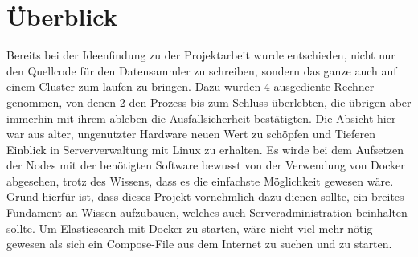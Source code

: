 \documentclass[12pt,oneside,a4paper,parskip]{scrbook}
\begin{document}
\section{Überblick} Bereits bei der Ideenfindung zu der Projektarbeit wurde entschieden, nicht nur den Quellcode für den Datensammler zu schreiben, sondern das ganze auch auf einem Cluster zum laufen zu bringen. Dazu wurden 4 ausgediente Rechner genommen, von denen 2 den Prozess bis zum Schluss überlebten, die übrigen aber immerhin mit ihrem ableben die Ausfallsicherheit bestätigten. Die Absicht hier war aus alter, ungenutzter Hardware neuen Wert zu schöpfen und Tieferen Einblick in Serververwaltung mit Linux zu erhalten. Es wirde bei dem Aufsetzen der Nodes mit der benötigten Software bewusst von der Verwendung von Docker abgesehen, trotz des Wissens, dass es die einfachste Möglichkeit gewesen wäre. Grund hierfür ist, dass dieses Projekt vornehmlich dazu dienen sollte, ein breites Fundament an Wissen aufzubauen, welches auch Serveradministration beinhalten sollte. Um Elasticsearch mit Docker zu starten, wäre nicht viel mehr nötig gewesen als sich ein Compose-File aus dem Internet zu suchen und zu starten.
\end{document}
